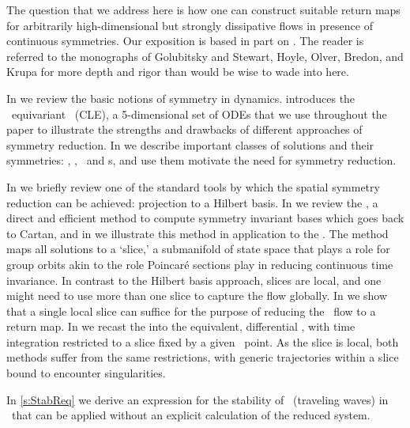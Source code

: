 The question that we address here is how one can construct
suitable return maps for arbitrarily high-dimensional but
strongly dissipative flows in presence of continuous
symmetries. Our exposition is based in part on
. The reader is
referred to the monographs of Golubitsky and
Stewart, Hoyle,
Olver, Bredon, and
Krupa for more depth and rigor than would be wise
to wade into here.

In  we review the basic notions of symmetry
in dynamics.  introduces the \
equivariant \cLe\ (CLE), a 5-dimensional set of ODEs that we
use throughout the paper to illustrate the strengths and
drawbacks of different approaches of symmetry reduction. In
 we describe important classes of solutions
and their symmetries: \eqva, \reqva, \po\ and \rpo s, and use
them motivate the need for symmetry reduction.

In  we briefly review one of the standard tools
by which the spatial symmetry reduction can be achieved:
projection to a Hilbert basis.
In  we review the {\mframes}, a direct and
efficient method to compute symmetry invariant bases which
goes back to Cartan, and in  we
illustrate this method in application to the \cLe. The method
maps all solutions to a `slice,' a submanifold  of state
space that plays a role for group orbits akin to the role
Poincar\'e sections play in reducing continuous time
invariance. In contrast to the Hilbert basis approach, slices
are local, and one might need to use more than one slice to
capture the flow globally. In  we show
that a single local slice can suffice for the purpose of
reducing the \cLe\ flow to a return map.
In  we recast the {\mframes}
into the equivalent, differential \mslices, with
time integration
restricted to a slice fixed by a given \statesp\ point.
As the slice is local, both methods suffer from the same
restrictions, with generic trajectories within a slice bound to encounter
singularities.

In \ref{s:StabReq} we derive an expression for the stability
of \reqva\ (traveling waves) in \reducedsp\
that can be applied without an explicit
calculation of the reduced system.
    \PC{unless you clean up \ref{s:StabReq} now, it will have to
        be omitted.}
